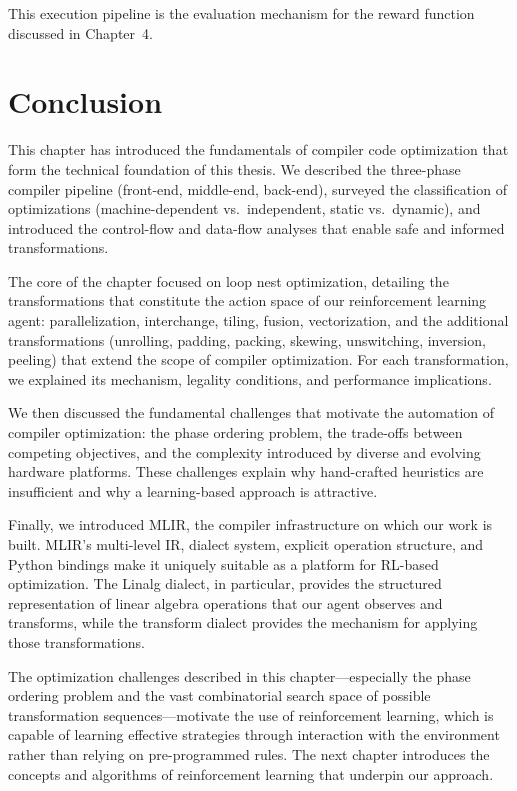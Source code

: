 This execution pipeline is the evaluation mechanism for the reward function discussed in Chapter~4.

\section{Conclusion}

This chapter has introduced the fundamentals of compiler code optimization that form the technical foundation of this thesis. We described the three-phase compiler pipeline (front-end, middle-end, back-end), surveyed the classification of optimizations (machine-dependent vs.\ independent, static vs.\ dynamic), and introduced the control-flow and data-flow analyses that enable safe and informed transformations.

The core of the chapter focused on loop nest optimization, detailing the transformations that constitute the action space of our reinforcement learning agent: parallelization, interchange, tiling, fusion, vectorization, and the additional transformations (unrolling, padding, packing, skewing, unswitching, inversion, peeling) that extend the scope of compiler optimization. For each transformation, we explained its mechanism, legality conditions, and performance implications.

We then discussed the fundamental challenges that motivate the automation of compiler optimization: the phase ordering problem, the trade-offs between competing objectives, and the complexity introduced by diverse and evolving hardware platforms. These challenges explain why hand-crafted heuristics are insufficient and why a learning-based approach is attractive.

Finally, we introduced MLIR, the compiler infrastructure on which our work is built. MLIR's multi-level IR, dialect system, explicit operation structure, and Python bindings make it uniquely suitable as a platform for RL-based optimization. The Linalg dialect, in particular, provides the structured representation of linear algebra operations that our agent observes and transforms, while the transform dialect provides the mechanism for applying those transformations.

The optimization challenges described in this chapter—especially the phase ordering problem and the vast combinatorial search space of possible transformation sequences—motivate the use of reinforcement learning, which is capable of learning effective strategies through interaction with the environment rather than relying on pre-programmed rules. The next chapter introduces the concepts and algorithms of reinforcement learning that underpin our approach.
